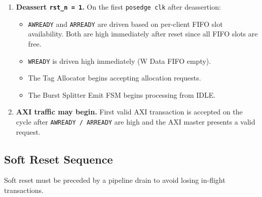\begin{enumerate}
  \item \textbf{Deassert \texttt{rst\_n = 1}.}
        On the first \texttt{posedge clk} after deassertion:
        \begin{itemize}
          \item \texttt{AWREADY} and \texttt{ARREADY} are driven based on
                per-client FIFO slot availability. Both are high immediately
                after reset since all FIFO slots are free.
          \item \texttt{WREADY} is driven high immediately (W Data FIFO empty).
          \item The Tag Allocator begins accepting allocation requests.
          \item The Burst Splitter Emit FSM begins processing from
                \textsc{IDLE}.
        \end{itemize}

  \item \textbf{AXI traffic may begin.}
        First valid AXI transaction is accepted on the cycle after
        \texttt{AWREADY / ARREADY} are high and the AXI master presents a
        valid request.
\end{enumerate}

\subsection{Soft Reset Sequence}

Soft reset must be preceded by a pipeline drain to avoid losing in-flight
transactions.

